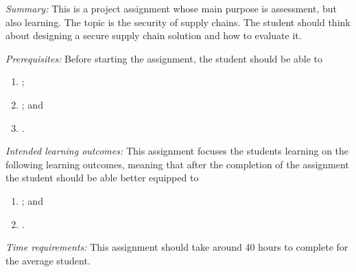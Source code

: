 
\emph{Summary:}
This is a project assignment whose main purpose is assessment, but also 
learning.
The topic is the security of supply chains.
The student should think about designing a secure supply chain solution and how 
to evaluate it.

\emph{Prerequisites:}
Before starting the assignment, the student should be able to
\begin{enumerate}[label={(LO\arabic*)},ref=LO\arabic*]
  \item \LOrelate;
  \item \LOevaluate; and
  \item \LOapply.
\end{enumerate}

\emph{Intended learning outcomes:}
This assignment focuses the students learning on the following learning 
outcomes, meaning that after the completion of the assignment the student 
should be able better equipped to
\begin{enumerate}[label={(LO\arabic*)},ref=LO\arabic*,resume]
  \item \LOplan; and
  \item \LOcomm.
\end{enumerate}

\emph{Time requirements:}
This assignment should take around 40 hours to complete for the average 
student.
